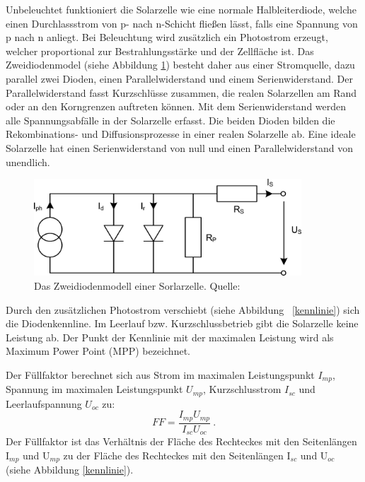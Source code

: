 \documentclass[a4paper,bibtotoc,oneside]{scrbook}
\begin{document}
\noindent Unbeleuchtet funktioniert die Solarzelle wie eine normale Halbleiterdiode, welche einen Durchlassstrom von p- nach n-Schicht fließen lässt, falls eine Spannung von p nach n anliegt. Bei Beleuchtung wird zusätzlich ein Photostrom erzeugt, welcher proportional zur Bestrahlungsstärke und der Zellfläche ist. Das Zweidiodenmodel (siehe Abbildung \ref{esb}) besteht daher aus einer Stromquelle, dazu parallel zwei Dioden, einen Parallelwiderstand und einem Serienwiderstand. Der Parallelwiderstand fasst Kurzschlüsse zusammen, die realen Solarzellen am Rand oder an den Korngrenzen auftreten können. Mit dem Serienwiderstand werden alle Spannungsabfälle in der Solarzelle erfasst. Die beiden Dioden bilden die Rekombinations- und Diffusionsprozesse in einer realen Solarzelle ab. Eine ideale Solarzelle hat einen Serienwiderstand von null und einen Parallelwiderstand von unendlich. 
\begin{figure}[htbp]
\centering
\includegraphics[width=100mm]{img/esb2.png}
\caption{Das Zweidiodenmodell einer Sorlarzelle. Quelle: \cite{pv}}\label{esb}
\end{figure}

\noindent Durch den zusätzlichen Photostrom verschiebt (siehe Abbildung ~\ref{kennlinie}) sich die Diodenkennline. Im Leerlauf  bzw. Kurzschlussbetrieb gibt die Solarzelle keine Leistung ab. Der Punkt der Kennlinie mit der maximalen Leistung wird als Maximum Power Point (MPP) bezeichnet.

Der Füllfaktor berechnet sich aus Strom im maximalen Leistungspunkt $I_{mp}$, Spannung im maximalen Leistungspunkt $U_{mp}$, Kurzschlusstrom $I_{sc}$ und Leerlaufspannung $U_{oc}$ zu:
  \begin{equation}
     FF = \frac {I_{mp} U_{mp}} {I_{sc} U_{oc}}~.
  \end{equation}
\noindent Der Füllfaktor ist das Verhältnis der Fläche des Rechteckes mit den Seitenlängen I$_{mp}$ und U$_{mp}$ zu der Fläche des Rechteckes mit den Seitenlängen I$_{sc}$ und U$_{oc}$ (siehe Abbildung \ref{kennlinie}).
\end{document}
